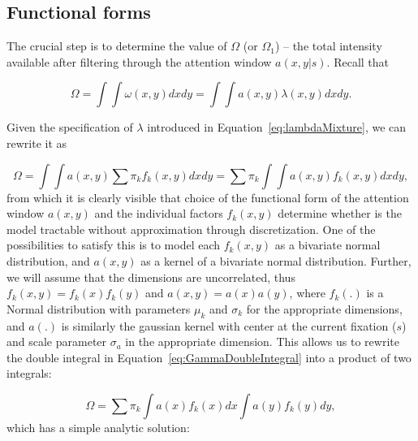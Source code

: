 \documentclass{article}
\begin{document}
\subsection{Functional forms}

The crucial step is to determine the value of $\Omega$ (or $\Omega_1$) -- the total intensity available after filtering through the attention window $a(x, y |
s)$. Recall that 

\begin{equation}
    \Omega = \int \int \omega(x, y) dx dy=  \int \int a(x, y) \lambda(x, y)dx dy.
\end{equation}

Given the specification of $\lambda$ introduced in Equation~\ref{eq:lambdaMixture}, we can rewrite it as

\begin{equation}
\label{eq:GammaDoubleIntegral}
    \Omega = \int \int a(x, y) \sum \pi_k f_k(x, y) dx dy = \sum \pi_k \int \int a(x, y) f_k(x, y) dx dy,
\end{equation}
from which it is clearly visible that choice of the functional form of the attention window $a(x, y)$ and the individual factors $f_k(x, y)$ determine whether is the model tractable without approximation through discretization. One of the possibilities to satisfy this is to model each $f_k(x, y)$ as a bivariate normal distribution, and $a(x, y)$ as a kernel of a bivariate normal distribution. Further, we will assume that the dimensions are uncorrelated, thus $f_k(x, y) = f_k(x)f_k(y)$ and $a(x, y) = a(x)a(y)$, where $f_k(.)$ is a Normal distribution with parameters $\mu_k$ and $\sigma_k$ for the appropriate dimensions, and $a(.)$ is similarly the gaussian kernel with center at the current fixation ($s$) and scale parameter $\sigma_a$ in the appropriate dimension. This allows us to rewrite the double integral in Equation~\ref{eq:GammaDoubleIntegral} into a product of two integrals:

\begin{equation}
    \Omega =  \sum \pi_k \int a(x)f_k(x) dx \int a(y)f_k(y) dy, 
\end{equation}
which has a simple analytic solution:
\end{document}
